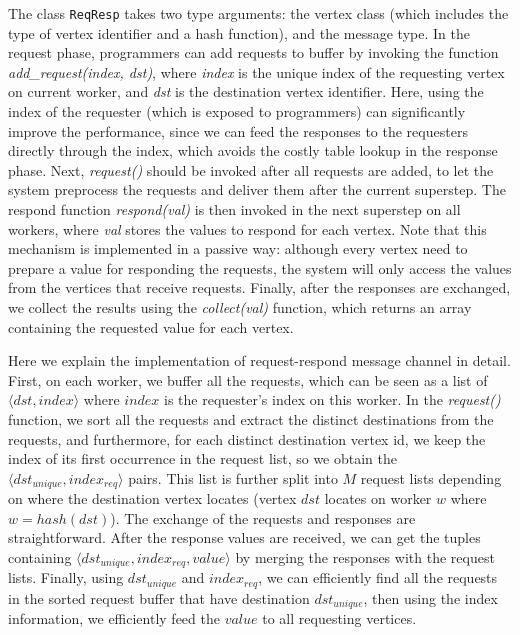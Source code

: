 \documentclass{sokendai_thesis} %
\begin{document}
The class \texttt{ReqResp} takes two type arguments: the vertex class (which includes the type of vertex identifier and a hash function), and the message type.
In the request phase, programmers can add requests to buffer by invoking the function \emph{add\_request(index, dst)}, where \emph{index} is the unique index of the requesting vertex on current worker, and \emph{dst} is the destination vertex identifier.
Here, using the index of the requester (which is exposed to programmers) can significantly improve the performance, since we can feed the responses to the requesters directly through the index, which avoids the costly table lookup in the response phase.
Next, \emph{request()} should be invoked after all requests are added, to let the system preprocess the requests and deliver them after the current superstep.
The respond function \emph{respond(val)} is then invoked in the next superstep on all workers, where \emph{val} stores the values to respond for each vertex.
Note that this mechanism is implemented in a passive way: although every vertex need to prepare a value for responding the requests, the system will only access the values from the vertices that receive requests.
Finally, after the responses are exchanged, we collect the results using the \emph{collect(val)} function, which returns an array containing the requested value for each vertex.

Here we explain the implementation of request-respond message channel in detail.
First, on each worker, we buffer all the requests, which can be seen as a list of $\langle dst,index\rangle$ where $index$ is the requester's index on this worker.
In the \emph{request()} function, we sort all the requests and extract the distinct destinations from the requests, and furthermore, for each distinct destination vertex id, we keep the index of its first occurrence in the request list, so we obtain the $\langle dst_{unique},index_{req}\rangle$ pairs.
This list is further split into $M$ request lists depending on where the destination vertex locates (vertex $dst$ locates on worker $w$ where $w=hash(dst)$).
The exchange of the requests and responses are straightforward.
After the response values are received, we can get the tuples containing $\langle dst_{unique},index_{req},value\rangle$ by merging the responses with the request lists.
Finally, using $dst_{unique}$ and $index_{req}$, we can efficiently find all the requests in the sorted request buffer that have destination $dst_{unique}$, then using the index information, we efficiently feed the $value$ to all requesting vertices.
\end{document}
